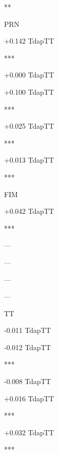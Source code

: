 \documentclass[
]{article}
\begin{document}
{}{}

**

PRN

{+0.142} {{Tdap}{TT}}

{}{}

{}{}

***

{+0.000} {{Tdap}{TT}}

{}{}

{}{}

{}

{+0.100} {{Tdap}{TT}}

{}{}

{}{}

***

{+0.025} {{Tdap}{TT}}

{}{}

{}{}

***

{+0.013} {{Tdap}{TT}}

{}{}

{}{}

***

FIM

{+0.042} {{Tdap}{TT}}

{}{}

{}{}

***

---

---

---

---

TT

{-0.011} {{Tdap}{TT}}

{}{}

{}{}

{}

{-0.012} {{Tdap}{TT}}

{}{}

{}{}

***

{-0.008} {{Tdap}{TT}}

{}{}

{}{}

{}

{+0.016} {{Tdap}{TT}}

{}{}

{}{}

***

{+0.032} {{Tdap}{TT}}

{}{}

{}{}

***
\end{document}
